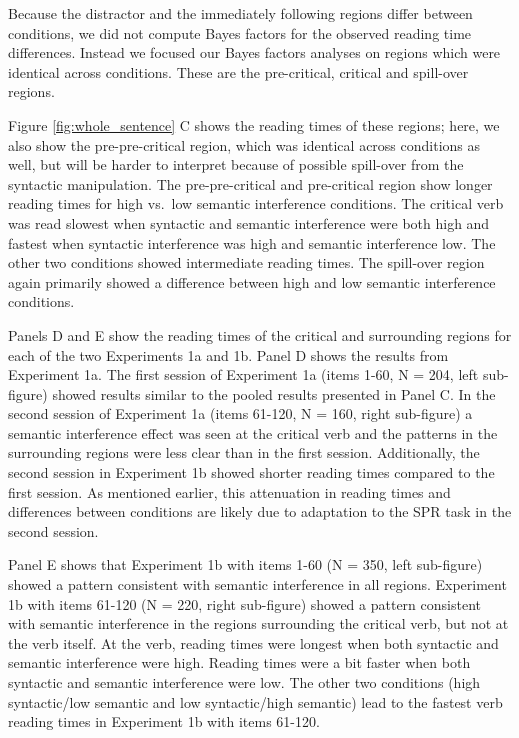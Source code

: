 \documentclass[a4paper, man, floatsintext]{apa7}
\begin{document}
Because the distractor and the immediately following regions differ between conditions, we did not compute Bayes factors for the observed reading time differences. Instead we focused our Bayes factors analyses on regions which were identical across conditions. These are the pre-critical, critical and spill-over regions.


Figure \ref{fig:whole_sentence} C shows the reading times of these regions; here, we also show the pre-pre-critical region, which was identical across conditions as well, but will be harder to interpret because of possible spill-over from the syntactic manipulation. The pre-pre-critical and pre-critical region show longer reading times for high vs.\ low semantic interference conditions. The critical verb was read slowest when syntactic and semantic interference were both high and fastest when syntactic interference was high and semantic interference low. The other two conditions showed intermediate reading times. The spill-over region again primarily showed a difference between high and low semantic interference conditions. 

Panels D and E show the reading times of the critical and surrounding regions for each of the two Experiments 1a and 1b. Panel D shows the results from Experiment 1a. The first session of Experiment 1a (items 1-60, N = 204, left sub-figure) showed results similar to the pooled results presented in Panel C. In the second session of Experiment 1a (items 61-120, N = 160, right sub-figure) a semantic interference effect was seen at the critical verb and the patterns in the surrounding regions were less clear than in the first session. Additionally, the second session in Experiment 1b showed shorter reading times compared to the first session. As mentioned earlier, this attenuation in reading times and differences between conditions are likely due to  adaptation to the SPR task in the second session. 

Panel E shows that Experiment 1b with items 1-60 (N = 350, left sub-figure) showed a pattern consistent with semantic interference in all regions. Experiment 1b with items 61-120 (N = 220, right sub-figure) showed a pattern consistent with semantic interference in the regions surrounding the critical verb, but not at the verb itself. At the verb, reading times were longest when both syntactic and semantic interference were high. Reading times were a bit faster when both syntactic and semantic interference were low. The other two conditions (high syntactic/low semantic and low syntactic/high semantic) lead to the fastest verb reading times in Experiment 1b with items 61-120. 
\end{document}
